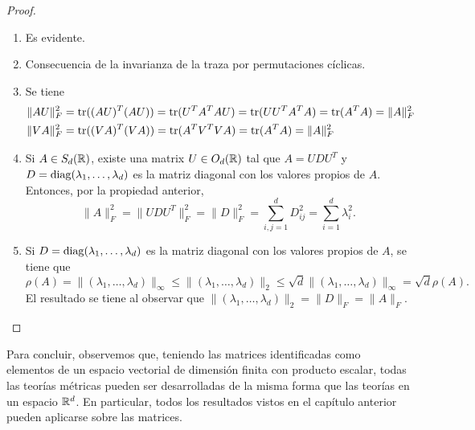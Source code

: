 \begin{proof}~
    \begin{enumerate}
        \item Es evidente.
        \item Consecuencia de la invarianza de la traza por permutaciones cíclicas.
        \item Se tiene
            \begin{align*}
                \|AU\|_F^2 &= \operatorname{tr}((AU)^T(AU)) = \operatorname{tr}(U^TA^TAU) = \operatorname{tr}(UU^TA^TA) = \operatorname{tr}(A^TA) = \|A\|^2_F \\
                \|VA\|_F^2 &= \operatorname{tr}((VA)^T(VA)) = \operatorname{tr}(A^TV^TVA) = \operatorname{tr}(A^TA) = \|A\|_F^2 
            \end{align*}
        \item Si $A \in S_d(\mathbb{R})$, existe una matrix $U \in O_d(\mathbb{R})$ tal que $A = UDU^T$ y $D = \operatorname{diag}(\lambda_1,\dots,\lambda_d)$ es la matriz diagonal con los valores propios de $A$. Entonces, por la propiedad anterior,
        \[ \|A\|_F^2 = \|UDU^T\|_F^2 = \|D\|_F^2 = \sum_{i,j=1}^d D_{ij}^2 = \sum_{i=1}^d \lambda_i^2. \]
        \item Si $D = \operatorname{diag}(\lambda_1,\dots,\lambda_d)$ es la matriz diagonal con los valores propios de $A$, se tiene que
        \[ \rho(A) = \|(\lambda_1,\dots,\lambda_d)\|_{\infty} \le \|(\lambda_1,\dots,\lambda_d)\|_2 \le \sqrt{d}\|(\lambda_1,\dots,\lambda_d)\|_{\infty} = \sqrt{d}\rho(A). \]
        El resultado se tiene al observar que $\|(\lambda_1,\dots,\lambda_d)\|_2 = \|D\|_F = \|A\|_F$.


    \end{enumerate}

\end{proof}

Para concluir, observemos que, teniendo las matrices identificadas como elementos de un espacio vectorial de dimensión finita con producto escalar, todas las teorías métricas pueden ser desarrolladas de la misma forma que las teorías en un espacio $\mathbb{R}^d$. En particular, todos los resultados vistos en el capítulo anterior pueden aplicarse sobre las matrices.

